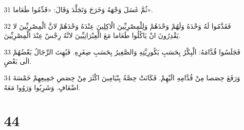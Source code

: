 \par 31 ثُمَّ غَسَلَ وَجْهَهُ وَخَرَجَ وَتَجَلَّدَ وَقَالَ: «قَدِّمُوا طَعَاما».
\par 32 فَقَدَّمُوا لَهُ وَحْدَهُ وَلَهُمْ وَحْدَهُمْ وَلِلْمِصْرِيِّينَ الْاكِلِينَ عِنْدَهُ وَحْدَهُمْ لانَّ الْمِصْرِيِّينَ لا يَقْدِرُونَ انْ يَاكُلُوا طَعَاما مَعَ الْعِبْرَانِيِّينَ لانَّهُ رِجْسٌ عِنْدَ الْمِصْرِيِّينَ.
\par 33 فَجَلَسُوا قُدَّامَهُ: الْبِكْرُ بِحَسَبِ بَكُورِيَّتِهِ وَالصَّغِيرُ بِحَسَبِ صِغَرِهِ. فَبُهِتَ الرِّجَالُ بَعْضُهُمْ الَى بَعْضٍ.
\par 34 وَرَفَعَ حِصَصا مِنْ قُدَّامِهِ الَيْهِمْ. فَكَانَتْ حِصَّةُ بِنْيَامِينَ اكْثَرَ مِنْ حِصَصِ جَمِيعِهِمْ خَمْسَةَ اضْعَافٍ. وَشَرِبُوا وَرَوُوا مَعَهُ.

\chapter{44}


